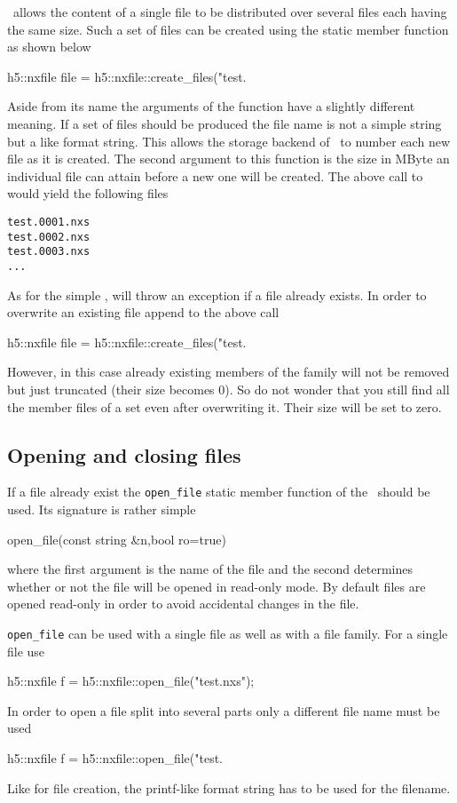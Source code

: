 \libpniio\ allows the content of a single file to be distributed over several
files each having the same size. Such a set of files can be created using the 
 static member function as shown below
\begin{cppcode}
h5::nxfile file = h5::nxfile::create_files("test.%
\end{cppcode}
Aside from its name the arguments of the  function have 
a slightly different meaning. If a set of files should be produced the file name
is not a simple string but a  like format string. This allows the
storage backend of \libpniio\ to number each new file as it is created.
The second argument to this function is the size in MByte an individual file can 
attain before a new one will be created. The above call to 
would yield the following files
\begin{verbatim}
test.0001.nxs
test.0002.nxs
test.0003.nxs
...
\end{verbatim}
As for the simple ,  will throw an
 exception if a file already exists. In order to overwrite an
existing file append  to the above call 
\begin{cppcode}
h5::nxfile file = h5::nxfile::create_files("test.%
\end{cppcode}
However, in this case already existing members of the family will not be removed
but just truncated (their size becomes $0$). So do not wonder that you still
find all the member files of a set even after overwriting it. Their size will be
set to zero.

\subsection{Opening and closing files}

If a file already exist the {\tt open\_file} static member function of the
\nxfile\ should be used.  Its signature is rather simple 
\begin{cppcode}
open_file(const string &n,bool ro=true)
\end{cppcode}
where the first argument is the name of the file and the second determines
whether or not the file will be opened in read-only mode. By default files are
opened read-only in order to avoid accidental changes in the file. 

\texttt{open\_file} can be used with a single file as well as with a file
family. For a single file use 
\begin{cppcode}
h5::nxfile f = h5::nxfile::open_file("test.nxs");
\end{cppcode}
In order to open a file split into several parts only a different file name 
must be used
\begin{cppcode}
h5::nxfile f = h5::nxfile::open_file("test.%
\end{cppcode}
Like for file creation, the printf-like format string has to be used for the 
filename. 


